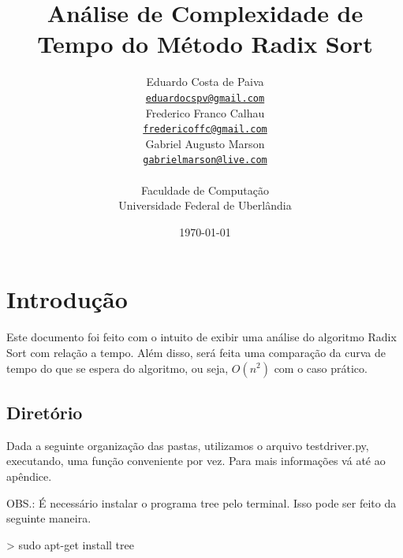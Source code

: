 \documentclass[12pt,a4paper,twoside]{report}
\title{Análise de Complexidade de Tempo do Método Radix Sort}
\date{}
\author{Eduardo Costa de Paiva \\
\texttt{\small \url{eduardocspv@gmail.com}}\\
Frederico Franco Calhau \\
\texttt{\small \url{fredericoffc@gmail.com}}\\
Gabriel Augusto Marson \\
\texttt{\small \url{gabrielmarson@live.com}}\\
\vspace{1cm} \\
Faculdade de Computação \\
Universidade Federal de Uberlândia
}
\date{\today}
\begin{document}
  \maketitle
\listoffigures
\listoftables
\lstlistoflistings

\tableofcontents


\fancyhead[RE,LO]{\thesection}

\setlength{\parskip}{0.15in} %

\chapter{Introdução}
Este documento foi feito com o intuito de exibir uma análise do algoritmo Radix Sort
com relação a tempo. Além disso, será feita uma comparação da curva de tempo do que se espera do
algoritmo, ou seja, $O(n^2)$ com o caso prático.

\section{Diretório}

Dada a seguinte organização das pastas, utilizamos o arquivo testdriver.py,  executando, uma função conveniente por vez. Para mais informações vá até ao apêndice.

OBS.: É necessário instalar o programa tree pelo terminal. Isso pode ser feito da seguinte maneira.

\begin{terminal}
> sudo apt-get install tree
\end{terminal}
\end{document}
